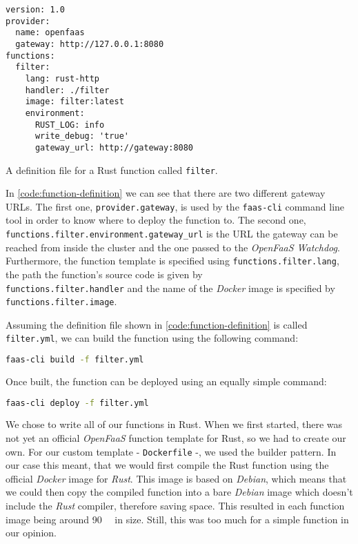 \begin{code}[H]
  \centering
  \begin{lstlisting}
version: 1.0
provider:
  name: openfaas
  gateway: http://127.0.0.1:8080
functions:
  filter:
    lang: rust-http
    handler: ./filter
    image: filter:latest
    environment:
      RUST_LOG: info
      write_debug: 'true'
      gateway_url: http://gateway:8080
  \end{lstlisting}
  \caption{A definition file for a Rust function called \texttt{filter}.}
  \label{code:function-definition}
\end{code}

In \autoref{code:function-definition} we can see that there are two different gateway URLs. The
first one, \texttt{provider.gateway}, is used by the \texttt{faas-cli} command line tool in order to
know where to deploy the function to. The second one,
\texttt{functions.filter.environment.gateway\_url} is the URL the gateway can be reached from inside
the cluster and the one passed to the \textit{OpenFaaS Watchdog}. Furthermore, the function template
is specified using \texttt{functions.filter.lang}, the path the function's source code is given by
\\
\texttt{functions.filter.handler} and the name of the \textit{Docker} image is specified by \\
\texttt{functions.filter.image}.

Assuming the definition file shown in \autoref{code:function-definition} is called
\texttt{filter.yml}, we can build the function using the following command:

\begin{lstlisting}[language=bash]
faas-cli build -f filter.yml
\end{lstlisting}

Once built, the function can be deployed using an equally simple command:

\begin{lstlisting}[language=bash]
faas-cli deploy -f filter.yml
\end{lstlisting}

We chose to write all of our functions in Rust. When we first started, there was not yet an official
\textit{OpenFaaS} function template for Rust, so we had to create our own. For our custom template -
\texttt{Dockerfile} -, we used the builder pattern. In our case this meant, that we would first
compile the Rust function using the official \textit{Docker} image for \textit{Rust}. This image is
based on \textit{Debian}, which means that we could then copy the compiled function into a bare
\textit{Debian} image which doesn't include the \textit{Rust} compiler, therefore saving space. This
resulted in each function image being around \SI{90}{\mega\byte} in size. Still, this was too much
for a simple function in our opinion.

